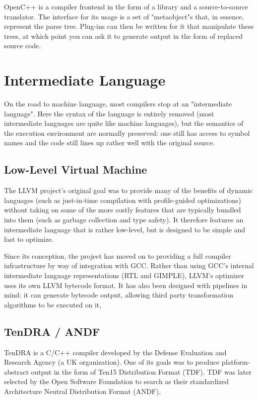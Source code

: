 \documentclass[12pt]{article}
\begin{document}
OpenC++ is a compiler frontend in the form of a library and a source-to-source translator. The interface for its usage is a set of "metaobject"s that, in essence, represent the parse tree. Plug-ins can then be written for it that manipulate these trees, at which point you can ask it to generate output in the form of replaced source code.

\section{Intermediate Language}

On the road to machine language, most compilers stop at an "intermediate language". Here the syntax of the language is entirely removed (most intermediate languages are quite like machine languages), but the semantics of the execution environment are normally preserved: one still has access to symbol names and the code still lines up rather well with the original source.

\subsection{Low-Level Virtual Machine}

The LLVM project's original goal was to provide many of the benefits of dynamic languages (such as just-in-time compilation with profile-guided optimizations) without taking on some of the more costly features that are typically bundled into them (such as garbage collection and type safety). It therefore features an intermediate language that is rather low-level, but is designed to be simple and fast to optimize.

Since its conception, the project has moved on to providing a full compiler infrastructure by way of integration with GCC. Rather than using GCC's internal intermediate language representations (RTL and GIMPLE), LLVM's optimizer uses its own LLVM bytecode format. It has also been designed with pipelines in mind: it can generate bytecode output, allowing third party transformation algorithms to be executed on it,

\subsection{TenDRA / ANDF}

TenDRA is a C/C++ compiler developed by the Defense Evaluation and Research Agency (a UK organization). One of its goals was to produce platform-abstract output in the form of Ten15 Distribution Format (TDF). TDF was later selected by the Open Software Foundation to search as their standardized Architecture Neutral Distribution Format (ANDF),
\end{document}
